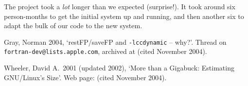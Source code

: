 \documentclass[11pt,twoside]{article}
\begin{document}
The project took a \emph{lot} longer than we expected (surprise!).  It
took around six person-months to get the initial system up and
running, and then another six to adapt the bulk of our code to the new
system.



\begin{references}
 Gray, Norman 2004, `restFP/saveFP and
\texttt{-lcc\textunderscore dynamic} -- why?'.  Thread on
\texttt{fortran-dev@lists.apple.com}, archived at
(cited November 2004).

 Wheeler, David A.\ 2001 (updated 2002), `More than a
Gigabuck: Estimating GNU/Linux's Size'.  Web page:
(cited November 2004).

\end{references}
\end{document}

